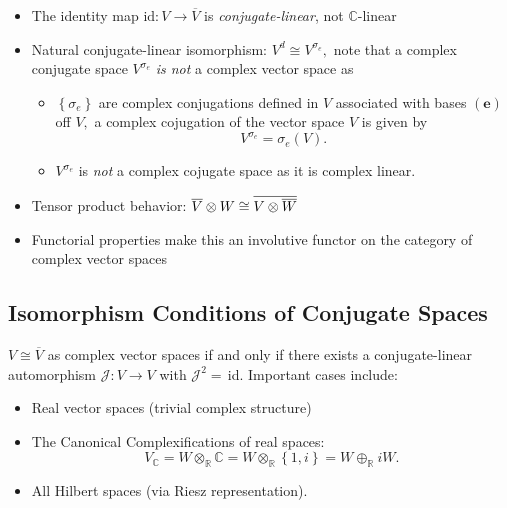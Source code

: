 \documentclass[aps,preprint]{revtex4}
\begin{document}
\begin{itemize}
\item The identity map $\text{id}:V\rightarrow \overline{V}$ is \emph{%
conjugate-linear}, not $\mathbb{C}$-linear

\item Natural conjugate-linear isomorphism: $V^{d}\cong V^{\sigma _{e}},$
note that a complex conjugate space $V^{\sigma _{e}}$ \emph{is not} a
complex vector space as

\begin{itemize}
\item $\left\{ \sigma _{e}\right\} $ are complex conjugations defined in $V$
associated with bases $\left( \mathbf{e}\right) $ off $V,$ a complex
cojugation of the vector space $V$ is given by 
\begin{equation}
V^{\sigma _{e}}=\sigma _{e}\left( V\right) .
\end{equation}

\item $V^{\sigma _{e}}$ is \emph{not} a complex cojugate space as it is
complex linear.
\end{itemize}

\item Tensor product behavior: $\overline{V}\otimes W\cong \overline{%
V\otimes \overline{W}}$

\item Functorial properties make this an involutive functor on the category
of complex vector spaces
\end{itemize}

\subsection{Isomorphism Conditions of Conjugate Spaces}

$V\cong \overline{V}$ as complex vector spaces if and only if there exists a
conjugate-linear automorphism $\mathcal{J}:V\rightarrow V$ with $\mathcal{J}%
^{2}=\,$id. Important cases include:

\begin{itemize}
\item Real vector spaces (trivial complex structure)

\item The Canonical Complexifications of real spaces: 
\begin{equation}
V_{\mathbb{C}}=W\otimes _{\mathbb{R}}\mathbb{C}=W\otimes _{\mathbb{R}%
}\left\{ 1,i\right\} =W\oplus _{\mathbb{R}}iW.
\end{equation}

\item All Hilbert spaces (via Riesz representation)\thinspace .
\end{itemize}
\end{document}
